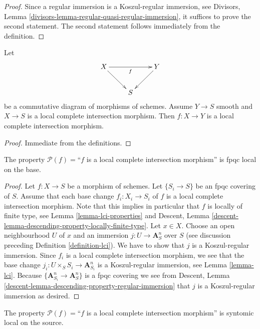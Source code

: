 \begin{proof}
Since a regular immersion is a Koszul-regular immersion, see
Divisors, Lemma \ref{divisors-lemma-regular-quasi-regular-immersion},
it suffices to prove the second statement. The second statement
follows immediately from the definition.
\end{proof}

\begin{lemma}
\label{lemma-lci-permanence}
Let
$$
\xymatrix{
X \ar[rr]_f \ar[rd] & & Y \ar[ld] \\
& S
}
$$
be a commutative diagram of morphisms of schemes. Assume $Y \to S$
smooth and $X \to S$ is a local complete intersection morphism.
Then $f : X \to Y$ is a local complete intersection morphism.
\end{lemma}

\begin{proof}
Immediate from the definitions.
\end{proof}

\begin{lemma}
\label{lemma-descending-property-lci}
The property $\mathcal{P}(f) =$``$f$ is a local complete intersection
morphism'' is fpqc local on the base.
\end{lemma}

\begin{proof}
Let $f : X \to S$ be a morphism of schemes.
Let $\{S_i \to S\}$ be an fpqc covering of $S$.
Assume that each base change $f_i : X_i \to S_i$ of $f$ is
a local complete intersection morphism.
Note that this implies in particular that $f$ is locally of finite
type, see
Lemma \ref{lemma-lci-properties}
and
Descent, Lemma \ref{descent-lemma-descending-property-locally-finite-type}.
Let $x \in X$. Choose an open neighbourhood $U$ of $x$ and
an immersion $j : U \to \mathbf{A}^n_S$ over $S$ (see
discussion preceding
Definition \ref{definition-lci}).
We have to show that $j$ is a Koszul-regular immersion.
Since $f_i$ is a local complete intersection morphism, we see
that the base change $j_i : U \times_S S_i \to \mathbf{A}^n_{S_i}$
is a Koszul-regular immersion, see
Lemma \ref{lemma-lci}.
Because $\{\mathbf{A}^n_{S_i} \to \mathbf{A}^n_S\}$ is a
fpqc covering we see from
Descent, Lemma \ref{descent-lemma-descending-property-regular-immersion}
that $j$ is a Koszul-regular immersion as desired.
\end{proof}

\begin{lemma}
\label{lemma-lci-syntomic-local-source}
The property $\mathcal{P}(f) =$``$f$ is a local complete intersection
morphism'' is syntomic local on the source.
\end{lemma}

